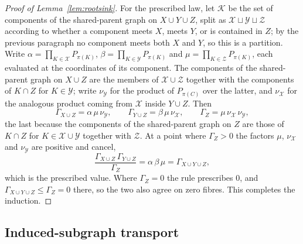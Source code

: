 \begin{proof}[Proof of Lemma~\ref{lem:rootsink}]
For the prescribed law, let $\mathcal K$ be the set of components of the shared-parent graph on $X\cup Y\cup Z$, split as $\mathcal X\sqcup\mathcal Y\sqcup\mathcal Z$ according to whether a component meets $X$, meets $Y$, or is contained in $Z$; by the previous paragraph no component meets both $X$ and $Y$, so this is a partition. Write $\alpha=\prod_{K\in\mathcal X}P_{\pi(K)}$, $\beta=\prod_{K\in\mathcal Y}P_{\pi(K)}$ and $\mu=\prod_{K\in\mathcal Z}P_{\pi(K)}$, each evaluated at the coordinates of its component. The components of the shared-parent graph on $X\cup Z$ are the members of $\mathcal X\cup\mathcal Z$ together with the components of $K\cap Z$ for $K\in\mathcal Y$; write $\nu_{\mathcal Y}$ for the product of $P_{\pi(C)}$ over the latter, and $\nu_{\mathcal X}$ for the analogous product coming from $\mathcal X$ inside $Y\cup Z$. Then
\[
\Gamma_{X\cup Z}=\alpha\,\mu\,\nu_{\mathcal Y},\qquad
\Gamma_{Y\cup Z}=\beta\,\mu\,\nu_{\mathcal X},\qquad
\Gamma_{Z}=\mu\,\nu_{\mathcal X}\,\nu_{\mathcal Y},
\]
the last because the components of the shared-parent graph on $Z$ are those of $K\cap Z$ for $K\in\mathcal X\cup\mathcal Y$ together with $\mathcal Z$. At a point where $\Gamma_Z>0$ the factors $\mu$, $\nu_{\mathcal X}$ and $\nu_{\mathcal Y}$ are positive and cancel,
\[
\frac{\Gamma_{X\cup Z}\,\Gamma_{Y\cup Z}}{\Gamma_{Z}}=\alpha\,\beta\,\mu=\Gamma_{X\cup Y\cup Z},
\]
which is the prescribed value. Where $\Gamma_Z=0$ the rule prescribes $0$, and $\Gamma_{X\cup Y\cup Z}\le\Gamma_Z=0$ there, so the two also agree on zero fibres. This completes the induction.
\end{proof}

\subsection{Induced-subgraph transport}\label{app:transport}

